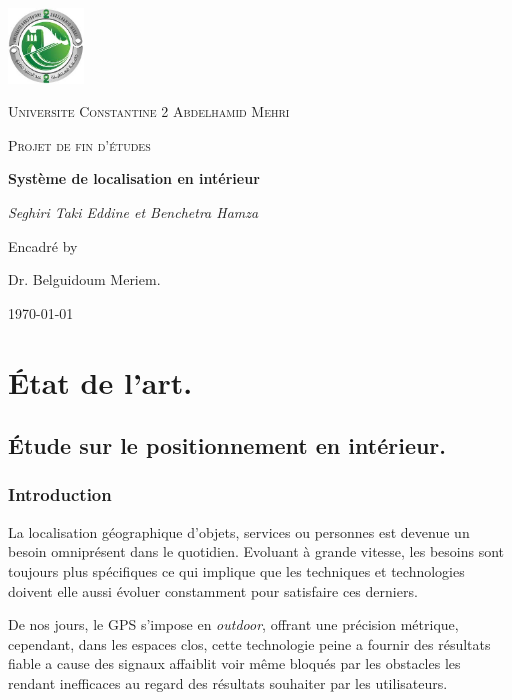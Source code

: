 \documentclass[12pt,a4paper]{report}
\begin{document}
	
	\begin{titlepage}
		\centering
		\includegraphics[width=0.15\textwidth]{logo.jpg}\par
		\vspace{1cm}
		{\scshape\LARGE Universite Constantine 2 Abdelhamid Mehri \par}
		\vspace{1cm}
		{\scshape\Large Projet de fin d'études\par}
		\vspace{1.5cm}
		{\huge\bfseries Système de localisation en intérieur\par}
		\vspace{2cm}
		{\Large\itshape Seghiri Taki Eddine et Benchetra Hamza\par}
		\vfill
		Encadré by\par
		Dr. Belguidoum Meriem.
		
		\vfill
		{\large \today\par}
	\end{titlepage}
	
	\tableofcontents
	\listoffigures
	
	
\part{État de l'art.}

\chapter{Étude sur le positionnement en intérieur.}


\section{Introduction}

\smallskip
La localisation géographique d'objets, services ou personnes est devenue un besoin omniprésent  dans le quotidien. Evoluant à grande vitesse, les besoins sont toujours plus spécifiques ce qui implique que les techniques et technologies doivent elle aussi évoluer constamment pour satisfaire ces derniers.\smallskip

De nos jours, le GPS s’impose en \textit{outdoor}, offrant une précision métrique, cependant, dans les espaces clos, cette technologie peine a fournir des résultats fiable a cause des signaux affaiblit voir même bloqués par les obstacles les rendant inefficaces au regard des résultats souhaiter par les utilisateurs.
\end{document}

